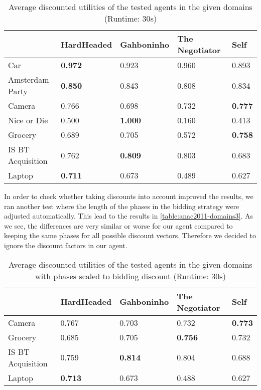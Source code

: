 \begin{table}[H]
  \centering
  \small
  \begin{tabular}{l|p{2.5cm}|p{2.5cm}|p{2.5cm}|p{2.5cm}|}
			    & HardHeaded     & Gahboninho     & The Negotiator & Self \\ \hline
  Car                       & \textbf{0.972} & 0.923          & 0.960          & 0.893 \\ \hline
  Amsterdam Party           & \textbf{0.850} & 0.843          & 0.808          & 0.834 \\ \hline
  Camera                    & 0.766          & 0.698          & 0.732          & \textbf{0.777} \\ \hline
  Nice or Die               & 0.500          & \textbf{1.000} & 0.160          & 0.413 \\ \hline
  Grocery                   & 0.689          & 0.705          & 0.572          & \textbf{0.758} \\ \hline
  IS BT Acquisition         & 0.762          & \textbf{0.809} & 0.803          & 0.683 \\ \hline
  Laptop                    & \textbf{0.711} & 0.673          & 0.489          & 0.627 \\ \hline
  \end{tabular}
  \caption{Average discounted utilities of the tested agents in the given domains (Runtime: $30$s) \label{table:anac2011-domains2}}
\end{table}

In order to check whether taking discounts into account improved the results, we ran another test where the length of the phases in the bidding strategy were adjusted automatically. This lead to the results in \autoref{table:anac2011-domains3}. As we see, the differences are very similar or worse for our agent compared to keeping the same phases for all possible discount vectors. Therefore we decided to ignore the discount factors in our agent.

\begin{table}[H]
  \centering
  \small
  \begin{tabular}{l|p{2.5cm}|p{2.5cm}|p{2.5cm}|p{2.5cm}|}
                            & HardHeaded     & Gahboninho & The Negotiator & Self \\ \hline
  Camera                    & 0.767          & 0.703          & 0.732          & \textbf{0.773} \\ \hline
  Grocery                   & 0.685          & 0.705          & \textbf{0.756} & 0.732          \\ \hline
  IS BT Acquisition         & 0.759          & \textbf{0.814} & 0.804          & 0.688          \\ \hline
  Laptop                    & \textbf{0.713} & 0.673          & 0.488          & 0.627          \\ \hline
  \end{tabular}
  \caption{Average discounted utilities of the tested agents in the given domains with phases scaled to bidding discount (Runtime: $30$s) \label{table:anac2011-domains3}}
\end{table}


